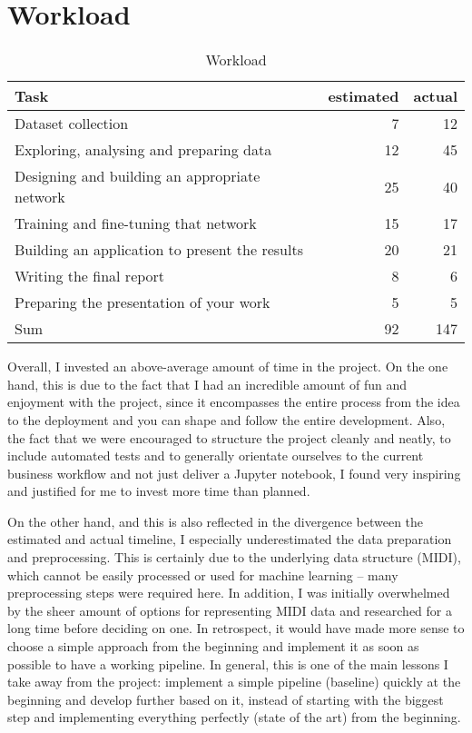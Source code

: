 \documentclass[a4paper, 10pt, xcolor=dvipsnames]{article} %
\begin{document}
\section{Workload}
\begin{table}[!h]
  \begin{center}
    \begin{tabular}{lrr}
      Task                                           & estimated & actual \\
      \hline
      \hline
      Dataset collection                             & 7         & 12     \\
      Exploring, analysing and preparing data        & 12        & 45     \\
      Designing and building an appropriate network  & 25        & 40     \\
      Training and fine-tuning that network          & 15        & 17     \\
      Building an application to present the results & 20        & 21     \\
      Writing the final report                       & 8         & 6      \\
      Preparing the presentation of your work        & 5         & 5      \\
      \hline
      Sum                                            & 92        & 147
    \end{tabular}
    \caption{Workload}
  \end{center}
\end{table}

Overall, I invested an above-average amount of time in the project. On the one
hand, this is due to the fact that I had an incredible amount of fun and
enjoyment with the project, since it encompasses the entire process from the
idea to the deployment and you can shape and follow the entire development.
Also, the fact that we were encouraged to structure the project cleanly and
neatly, to include automated tests and to generally orientate ourselves to the
current business workflow and not just deliver a Jupyter notebook, I found very
inspiring and justified for me to invest more time than planned.

On the other hand, and this is also reflected in the divergence between the
estimated and actual timeline, I especially underestimated the data preparation
and preprocessing. This is certainly due to the underlying data structure
(MIDI), which cannot be easily processed or used for machine learning -- many
preprocessing steps were required here. In addition, I was initially
overwhelmed by the sheer amount of options for representing MIDI data and
researched for a long time before deciding on one. In retrospect, it would have
made more sense to choose a simple approach from the beginning and implement it
as soon as possible to have a working pipeline. In general, this is one of the
main lessons I take away from the project: implement a simple pipeline
(baseline) quickly at the beginning and develop further based on it, instead of
starting with the biggest step and implementing everything perfectly (state of
the art) from the beginning.
\end{document}
